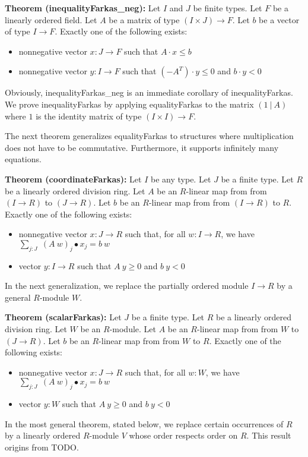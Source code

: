 \documentclass[]{article}
\renewcommand{\.}{\hskip .75pt}
\let\r=\rightarrow
\let\*=\cdot
\begin{document}
\medskip \noindent
\textbf{Theorem (inequalityFarkas\_neg):}
Let $I$ and $J$ be finite types.
Let $F$ be a linearly ordered field.
Let $A$ be a matrix of type $(I \times J) \r F$.
Let $b$ be a vector of type $I \r F$.
Exactly one of the following exists:
\begin{itemize}
\item nonnegative vector $x : J \r F$ such that $A \* x \le b$
\item nonnegative vector $y : I \r F$ such that $(-A^T) \* y \le 0$ and $b \* y < 0$
\end{itemize}
Obviously, inequalityFarkas\_neg is an immediate corollary of inequalityFarkas.
We prove inequalityFarkas by applying equalityFarkas 
to the matrix $(1~|~A)$ where $1$ is the identity matrix of type
$(I \times I) \r F$.

The next theorem generalizes equalityFarkas to structures where
multiplication does not have to be commutative.
Furthermore, it supports infinitely many equations.

\medskip \noindent
\textbf{Theorem (coordinateFarkas):}
Let $I$ be any type.
Let $J$ be a finite type.
Let $R$ be a linearly ordered division ring.
Let $A$ be an $R$-linear map from from $(I \r R)$ to $(J \r R)$.
Let $b$ be an $R$-linear map from from $(I \r R)$ to $R$.
Exactly one of the following exists:
\begin{itemize}
\item nonnegative vector $x : J \r R$ such that, for all $w : I \r R$, we have
$ \sum_{j : J}\; (A~w)_j \bullet x_j = b~w $
\item vector $y : I \r R$ such that $A~y \ge 0$ and $b~y < 0$
\end{itemize}
In the next generalization, we replace the partially ordered module $I \r R$ by
a general $R$-module $W$.

\medskip \noindent
\textbf{Theorem (scalarFarkas):}
Let $J$ be a finite type.
Let $R$ be a linearly ordered division ring.
Let $W$ be an $R$-module.
Let $A$ be an $R$-linear map from from $W$ to $(J \r R)$.
Let $b$ be an $R$-linear map from from $W$ to $R$.
Exactly one of the following exists:
\begin{itemize}
\item nonnegative vector $x : J \r R$ such that, for all $w : W$, we have
$ \sum_{j : J}\; (A~w)_j \bullet x_j = b~w $
\item vector $y : W$ such that $A~y \ge 0$ and $b~y < 0$
\end{itemize}
In the most general theorem, stated below, we replace certain occurrences of $R$ by
a linearly ordered $R$-module $V$ whose order respects order on $R$.
This result origins from TODO.
\end{document}
